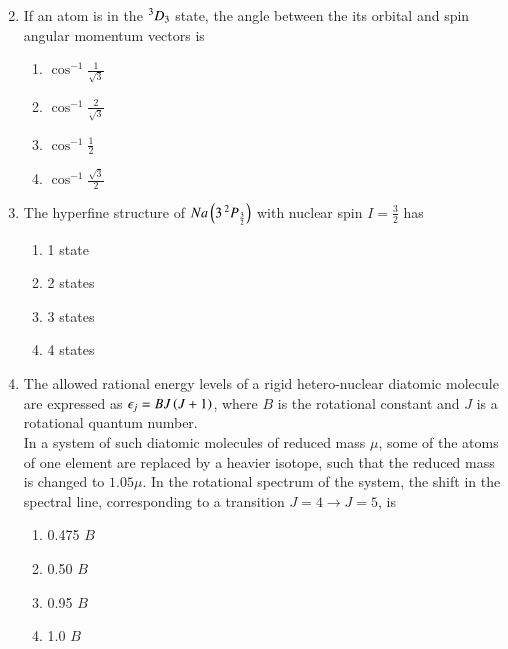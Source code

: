 \documentclass[journal]{IEEEtran}
\begin{document}
\begin{enumerate}[start=35]
\begin{multicols}{2}
\begin{enumerate}
    \end{enumerate}
\end{multicols}
\item If an atom is in the $\prescript{3}{}{D}_3$ state, the angle between the its orbital and spin angular momentum vectors  is 
\begin{multicols}{4}
    \begin{enumerate}
        \item $\cos^{-1}\frac{1}{\sqrt{3}}$
        \item $\cos^{-1}\frac{2}{\sqrt{3}}$
        \item $\cos^{-1}\frac{1}{2}$
        \item $\cos^{-1}\frac{\sqrt{3}}{2}$
    \end{enumerate}
\end{multicols}
\item  The hyperfine structure of $Na\left(3\prescript{2}{}{P}_\frac{3}{2}\right)$ with nuclear spin $I=\frac{3}{2}$ has 
\begin{multicols}{4}
   \begin{enumerate}
       \item 1 state 
       \item 2 states
       \item 3 states
       \item 4 states
   \end{enumerate}
\end{multicols}
\item The allowed rational energy levels of a rigid hetero-nuclear diatomic molecule are expressed as $\epsilon_j=BJ\left(J+1\right)$, where $B$ is the rotational constant and $J$ is a rotational quantum number.\\ In a system of such diatomic molecules of reduced  mass $\mu$, some of the atoms of one element are replaced by a heavier isotope, such that the reduced mass is changed to $1.05\mu$. In the rotational spectrum of the system, the shift in the spectral line, corresponding to a transition $J=4 \rightarrow J=5$, is 
\begin{multicols}{4}
    \begin{enumerate}
        \item 0.475 $B$
        \item 0.50 $B$
        \item 0.95 $B$
        \item 1.0 $B$
    \end{enumerate}
\end{multicols}

\end{enumerate}
\end{document}
